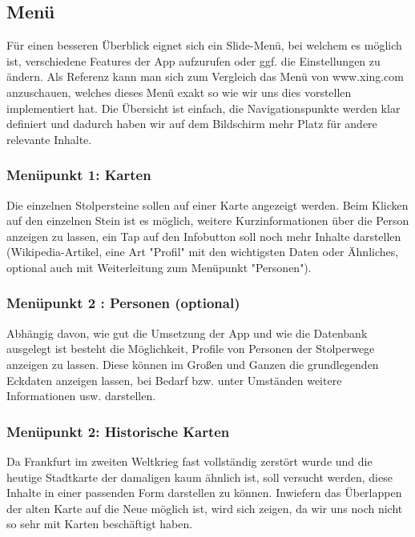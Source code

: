 \documentclass[a4paper, 11pt]{report}
\begin{document}
	\subsection*{Menü}
	
	Für einen besseren Überblick eignet sich ein Slide-Menü, bei welchem es möglich ist, verschiedene Features der App aufzurufen oder ggf. die Einstellungen zu ändern. Als Referenz kann man sich zum Vergleich das Menü von www.xing.com anzuschauen, welches dieses Menü exakt so wie wir uns dies vorstellen implementiert hat. Die Übersicht ist einfach, die Navigationspunkte werden klar definiert und dadurch haben wir auf dem Bildschirm mehr Platz für andere relevante Inhalte.
	
	\subsubsection*{Menüpunkt 1: Karten}
	
	Die einzelnen Stolpersteine sollen auf einer Karte angezeigt werden. Beim Klicken auf den einzelnen Stein ist es möglich, weitere Kurzinformationen über die Person anzeigen zu lassen, ein Tap auf den Infobutton soll noch mehr Inhalte darstellen (Wikipedia-Artikel, eine Art "Profil" mit den wichtigsten Daten oder Ähnliches, optional auch mit Weiterleitung zum Menüpunkt "Personen").
	
	\subsubsection{Menüpunkt 2 : Personen (optional)}
	
	Abhängig davon, wie gut die Umsetzung der App und wie die Datenbank ausgelegt ist besteht die Möglichkeit, Profile von Personen der Stolperwege anzeigen zu lassen. Diese können im Großen und Ganzen die grundlegenden Eckdaten anzeigen lassen, bei Bedarf bzw. unter Umständen weitere Informationen usw. darstellen.
	
	\subsubsection{Menüpunkt 2: Historische Karten}
	
	Da Frankfurt im zweiten Weltkrieg fast vollständig zerstört wurde und die heutige Stadtkarte der damaligen kaum ähnlich ist, soll versucht werden, diese Inhalte in einer passenden Form darstellen zu können. Inwiefern das Überlappen der alten Karte auf die Neue möglich ist, wird sich zeigen, da wir uns noch nicht so sehr mit Karten beschäftigt haben. 
	
\end{document}
